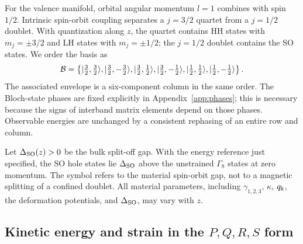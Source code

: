 For the valence manifold, orbital angular momentum $l=1$ combines with spin $1/2$. Intrinsic spin-orbit coupling separates a $j=3/2$ quartet from a $j=1/2$ doublet. With quantization along $z$, the quartet contains HH states with $m_j=\pm3/2$ and LH states with $m_j=\pm1/2$; the $j=1/2$ doublet contains the SO states. We order the basis as
\begin{equation}
\mathcal B=\left\{
\lvert \tfrac32,\tfrac32\rangle,\lvert \tfrac32,-\tfrac32\rangle,
\lvert \tfrac32,\tfrac12\rangle,\lvert \tfrac32,-\tfrac12\rangle,
\lvert \tfrac12,\tfrac12\rangle,\lvert \tfrac12,-\tfrac12\rangle
\right\}.
\label{eq:basis}
\end{equation}
The associated envelope is a six-component column in the same order. The Bloch-state phases are fixed explicitly in Appendix~\ref{app:phases}; this is necessary because the signs of interband matrix elements depend on those phases. Observable energies are unchanged by a consistent rephasing of an entire row and column.

Let $\Delta_{\mathrm{SO}}(z)>0$ be the bulk split-off gap. With the energy reference just specified, the SO hole states lie $\Delta_{\mathrm{SO}}$ above the unstrained $\Gamma_8$ states at zero momentum. The symbol refers to the material spin-orbit gap, not to a magnetic splitting of a confined doublet. All material parameters, including $\gamma_{1,2,3}$, $\kappa$, $q_{\mathrm k}$, the deformation potentials, and $\Delta_{\mathrm{SO}}$, may vary with $z$.

\subsection{Kinetic energy and strain in the \texorpdfstring{$P,Q,R,S$}{P,Q,R,S} form}

